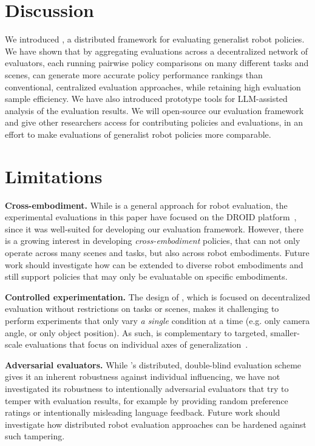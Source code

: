 \section{Discussion}
\label{sec:conclusion} 
\vspace{-1em}
We introduced \Acronym{}, a distributed framework for evaluating generalist robot policies. We have shown that by aggregating evaluations across a decentralized network of evaluators, each running pairwise policy comparisons on many different tasks and scenes, \Acronym{} can generate more accurate policy performance rankings than conventional, centralized evaluation approaches, while retaining high evaluation sample efficiency. We have also introduced prototype tools for LLM-assisted analysis of the evaluation results. We will open-source our \Acronym{} evaluation framework and give other researchers access for contributing policies and evaluations, in an effort to make evaluations of generalist robot policies more comparable.

\section{Limitations}
\label{sec:limitations}

\textbf{Cross-embodiment.} While \Acronym{} is a general approach for robot evaluation, the experimental evaluations in this paper have focused on the DROID platform~\citep{khazatsky2024droid}, since it was well-suited for developing our evaluation framework. However, there is a growing interest in developing \emph{cross-embodiment} policies, that can not only operate across many scenes and tasks, but also across robot embodiments. Future work should investigate how \Acronym{} can be extended to diverse robot embodiments and still support policies that may only be evaluatable on specific embodiments.

\textbf{Controlled experimentation.} The design of \Acronym{}, which is focused on decentralized evaluation without restrictions on tasks or scenes, makes it challenging to perform experiments that only vary \emph{a single} condition at a time (e.g. only camera angle, or only object position). As such, \Acronym{} is complementary to targeted, smaller-scale evaluations that focus on individual axes of generalization~\citep{gao2025taxonomy}. %

\textbf{Adversarial evaluators.} While \Acronym{}'s distributed, double-blind evaluation scheme gives it an inherent robustness against individual influencing, we have not investigated its robustness to intentionally adversarial evaluators that try to temper with evaluation results, for example by providing random preference ratings or intentionally misleading language feedback. Future work should investigate how distributed robot evaluation approaches can be hardened against such tampering.

